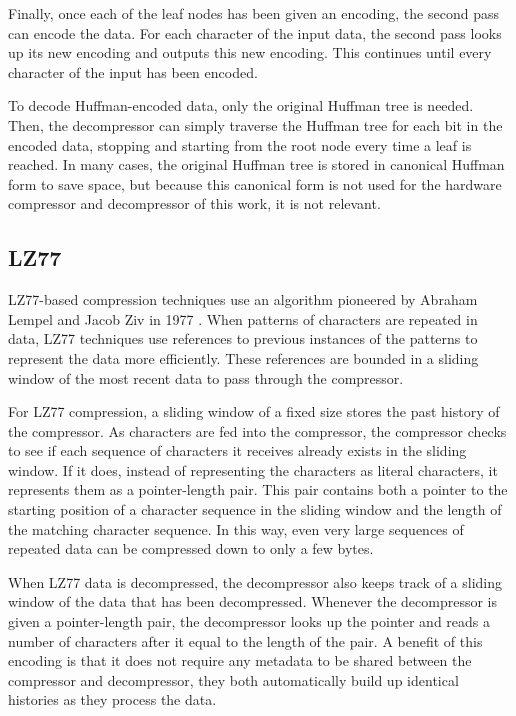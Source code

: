 \documentclass[doublespace,nopageskip]{VTthesis}
\begin{document}
Finally, once each of the leaf nodes has been given an encoding, the second pass can encode the data. For each character of the input data, the second pass looks up its new encoding and outputs this new encoding. This continues until every character of the input has been encoded.

To decode Huffman-encoded data, only the original Huffman tree is needed. Then, the decompressor can simply traverse the Huffman tree for each bit in the encoded data, stopping and starting from the root node every time a leaf is reached. In many cases, the original Huffman tree is stored in canonical Huffman form to save space, but because this canonical form is not used for the hardware compressor and decompressor of this work, it is not relevant.

\subsection{LZ77}\label{ss:lz77}
LZ77-based compression techniques use an algorithm pioneered by Abraham Lempel and Jacob Ziv in 1977 \cite{lz77}. When patterns of characters are repeated in data, LZ77 techniques use references to previous instances of the patterns to represent the data more efficiently. These references are bounded in a sliding window of the most recent data to pass through the compressor.

For LZ77 compression, a sliding window of a fixed size stores the past history of the compressor. As characters are fed into the compressor, the compressor checks to see if each sequence of characters it receives already exists in the sliding window. If it does, instead of representing the characters as literal characters, it represents them as a pointer-length pair. This pair contains both a pointer to the starting position of a character sequence in the sliding window and the length of the matching character sequence. In this way, even very large sequences of repeated data can be compressed down to only a few bytes.

When LZ77 data is decompressed, the decompressor also keeps track of a sliding window of the data that has been decompressed. Whenever the decompressor is given a pointer-length pair, the decompressor looks up the pointer and reads a number of characters after it equal to the length of the pair. A benefit of this encoding is that it does not require any metadata to be shared between the compressor and decompressor, they both automatically build up identical histories as they process the data.
\end{document}

